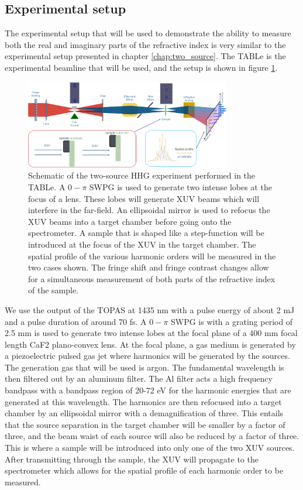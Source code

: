 \subsection{Experimental setup}
\label{sec:experimental_setup_refrac}
The experimental setup that will be used to demonstrate the ability to measure both the real and imaginary parts of the refractive index is very similar to the experimental setup presented in chapter \ref{chap:two_source}.  The TABLe is the experimental beamline that will be used, and the setup is shown in figure \ref{fig:refract_schematic}.
\begin{figure}
	\centering
	\includegraphics[width=0.8\textwidth]{figures/refractive_index/experimental_setup.png}
	\caption{Schematic of the two-source HHG experiment performed in the TABLe. A $0-\pi$ SWPG is used to generate two intense lobes at the focus of a lens.  These lobes will generate XUV beams which will interfere in the far-field.  An ellipsoidal mirror is used to refocus the XUV beams into a target chamber before going onto the spectrometer. A sample that is shaped like a step-function will be introduced at the focus of the XUV in the target chamber.  The spatial profile of the various harmonic orders will be measured in the two cases shown.  The fringe shift and fringe contrast changes allow for a simultaneous measurement of both parts of the refractive index of the sample.}
	\label{fig:refract_schematic}
\end{figure}
We use the output of the TOPAS at 1435 nm with a pulse energy of about 2 mJ and a pulse duration of around 70 fs. A $0-\pi$ SWPG is with a grating period of 2.5 mm is used to generate two intense lobes at the focal plane of a 400 mm focal length CaF2 plano-convex lens. At the focal plane, a gas medium is generated by a piezoelectric pulsed gas jet where harmonics will be generated by the sources.  The generation gas that will be used is argon. The fundamental wavelength is then filtered out by an aluminum filter.  The Al filter acts a high frequency bandpass with a bandpass region of 20-72 eV for the harmonic energies that are generated at this wavelength.  The harmonics are then refocused into a target chamber by an ellipsoidal mirror with a demagnification of three.  This entails that the source separation in the target chamber will be smaller by a factor of three, and the beam waist of each source will also be reduced by a factor of three.  This is where a sample will be introduced into only one of the two XUV sources.  After transmitting through the sample, the XUV will propagate to the spectrometer which allows for the spatial profile of each harmonic order to be measured.


